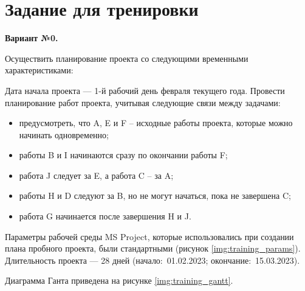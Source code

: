 \chapter{Задание для тренировки}

\textbf{Вариант №0.}

Осуществить планирование проекта со следующими временными характеристиками:

Дата начала проекта --- 1-й рабочий день февраля текущего года.
Провести планирование работ проекта, учитывая следующие связи между задачами:
\begin{itemize}[label = ---]
    \item предусмотреть, что A, E и F – исходные работы проекта, которые можно начинать 
    одновременно;
    \item работы B и I начинаются сразу по окончании работы F;
    \item работа J следует за E, а работа C – за A;
    \item работы H и D следуют за B, но не могут начаться, пока не завершена C;
    \item работа G начинается после завершения H и J.
\end{itemize}

Параметры рабочей среды MS Project, которые использовались при создании плана пробного проекта, 
были стандартными (рисунок \ref{img:training_params}).
Длительность проекта --- 28 дней (начало:~01.02.2023; окончание:~15.03.2023).

\newpage
Диаграмма Ганта приведена на рисунке \ref{img:training_gantt}.
